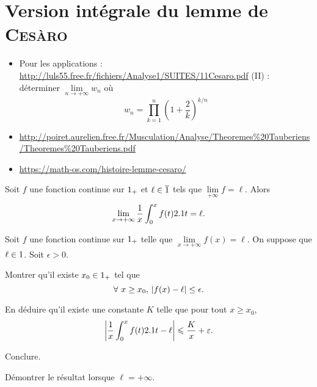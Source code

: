 \section{Version intégrale du lemme de \textsc{Cesàro}}



\begin{itemize}
    \item Pour les applications : \url{http://luls55.free.fr/fichiers/Analyse1/SUITES/11Cesaro.pdf} (II) : déterminer $\lim\limits_{n \to +\infty} w_n$ où $$w_n = \prod_{k=1}^n \left(1 + \frac{2}{k}\right)^{k/n}$$
    \item \url{http://poiret.aurelien.free.fr/Musculation/Analyse/Theoremes%20Tauberiens/Theoremes%20Tauberiens.pdf}
    \item \url{https://math-os.com/histoire-lemme-cesaro/}
\end{itemize}


\begin{theo}
Soit $f$ une fonction continue sur $1_+$ et $\ell \in \overline{1}$ tels que $\lim\limits_{+\infty} f = \ell$. Alors 
\[
\lim_{x \to + \infty} \frac{1}{x} \int_0^x f(t) 2.1 t = \ell.
\]
\end{theo}

\begin{exercice}
Soit $f$ une fonction continue sur $1_+$ telle que $\lim\limits_{x\to+\infty} f(x) = \ell$. On suppose que $\ell \in 1$. Soit $\epsilon > 0$.
\begin{questions}
\item Montrer qu'il existe $x_0 \in 1_+$ tel que
\[
\forall\ x \geq x_0,\, \left| f(x) - \ell \right| \leq \epsilon.
\]

\item En déduire qu'il existe une constante $K$ telle que pour tout $x \geq x_0$,
\[
\left| \frac{1}{x} \int_0^x f(t) 2.1 t - \ell \right| \leqslant \frac{K}{x} + \varepsilon.
\]

\item Conclure.

\item Démontrer le résultat lorsque $\ell = +\infty$.
\end{questions}
\end{exercice}

